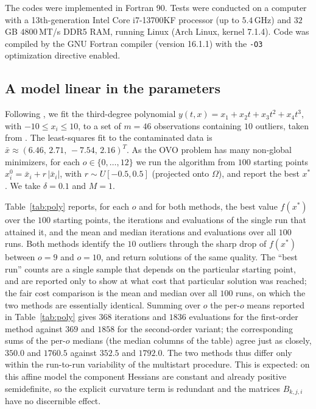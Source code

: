 \documentclass[11pt]{article}
\newcounter{alg}[section]
\begin{document}
The codes were implemented in Fortran 90. Tests were conducted on a computer
with a 13th-generation Intel Core i7-13700KF processor (up to $5.4$\,GHz) and
$32$\,GB $4800$\,MT/s DDR5 RAM,
running Linux (Arch Linux, kernel 7.1.4). Code was compiled by the GNU Fortran
compiler (version 16.1.1) with the \texttt{-O3} optimization directive enabled.

\subsection{A model linear in the parameters} \label{subsec:poly}

Following \cite{dunder1}, we fit the third-degree polynomial
$y(t,x)=x_1+x_2t+x_3t^2+x_4t^3$, with $-10\le x_i\le10$, to a set of $m=46$
observations containing $10$ outliers, taken from \cite{dunder1}. The
least-squares fit to the contaminated data is
$\bar x\approx(6.46,\,2.71,\,-7.54,\,2.16)^T$. As the OVO problem has many
non-global minimizers, for each $o\in\{0,\dots,12\}$ we run the algorithm from
$100$ starting points $x^0_i=\bar x_i+r\,|\bar x_i|$, with $r\sim U[-0.5,0.5]$
(projected onto $\Omega$), and report the best $x^*$. We take $\delta=0.1$ and
$M=1$.

Table~\ref{tab:poly} reports, for each $o$ and for both methods, the best value
$f(x^*)$ over the $100$ starting points, the iterations and evaluations of the
single run that attained it, and the mean and median iterations and evaluations
over all $100$ runs. Both methods identify the $10$ outliers
through the sharp drop of $f(x^*)$ between $o=9$ and $o=10$, and return solutions
of the same quality. The ``best run'' counts are a single sample that depends on
the particular starting point, and are reported only to show at what cost that
particular solution was reached; the fair cost comparison is the mean and median over all
$100$ runs, on which the two methods are essentially identical. Summing over $o$
the per-$o$ means reported in
Table~\ref{tab:poly} gives $368$ iterations and $1836$ evaluations for the
first-order method against $369$ and $1858$ for the second-order variant; the
corresponding sums of the per-$o$ medians (the median columns of the table)
agree just as closely, $350.0$ and $1760.5$ against $352.5$ and $1792.0$. The two methods thus
differ only within the run-to-run variability of the multistart
procedure. This is expected: on this affine model the component Hessians are
constant and already positive semidefinite, so the explicit curvature term is
redundant and the matrices $B_{k,j,i}$ have no discernible effect.
\end{document}
